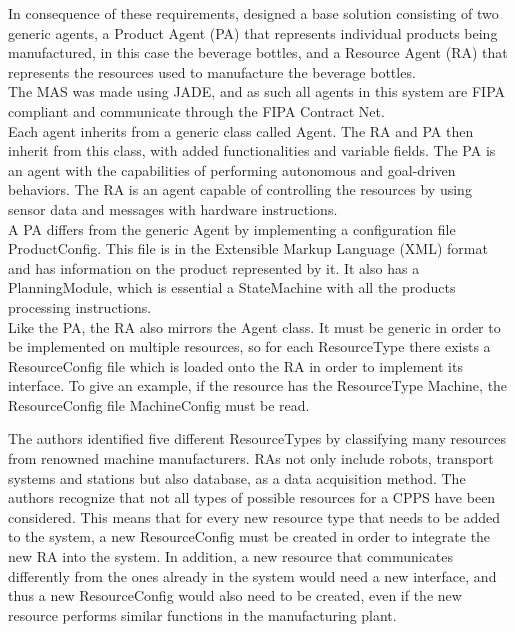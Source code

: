 In consequence of these requirements, \citeauthor{bottling_plant_part1} designed a base solution consisting of two generic agents, a Product Agent (PA) that represents individual products being manufactured, in this case the beverage bottles, and a Resource Agent (RA) that represents the resources used to manufacture the beverage bottles.\\

The MAS was made using JADE, and as such all agents in this system are FIPA compliant and communicate through the FIPA Contract Net.\\

Each agent inherits from a generic class called Agent. The RA and PA then inherit from this class, with added functionalities and variable fields. The PA is an agent with the capabilities of performing autonomous and goal-driven behaviors. The RA is an agent capable of controlling the resources by using sensor data and messages with hardware instructions.\\

A PA differs from the generic Agent by implementing a configuration file ProductConfig. This file is in the Extensible Markup Language (XML) format and has information on the product represented by it. It also has a PlanningModule, which is essential a StateMachine with all the products processing instructions.\\

Like the PA, the RA also mirrors the Agent class. It must be generic in order to be implemented on multiple resources, so for each ResourceType there exists a ResourceConfig file which is loaded onto the RA in order to implement its interface. To give an example, if the resource has the ResourceType Machine, the ResourceConfig file MachineConfig must be read.

The authors identified five different ResourceTypes by classifying many resources from renowned machine manufacturers. RAs not only include robots, transport systems and stations but also database, as a data acquisition method. The authors recognize that not all types of possible resources for a CPPS have been considered. This means that for every new resource type that needs to be added to the system, a new ResourceConfig must be created in order to integrate the new RA into the system. In addition, a new resource that communicates differently from the ones already in the system would need a new interface, and thus a new ResourceConfig would also need to be created, even if the new resource performs similar functions in the manufacturing plant.\\

